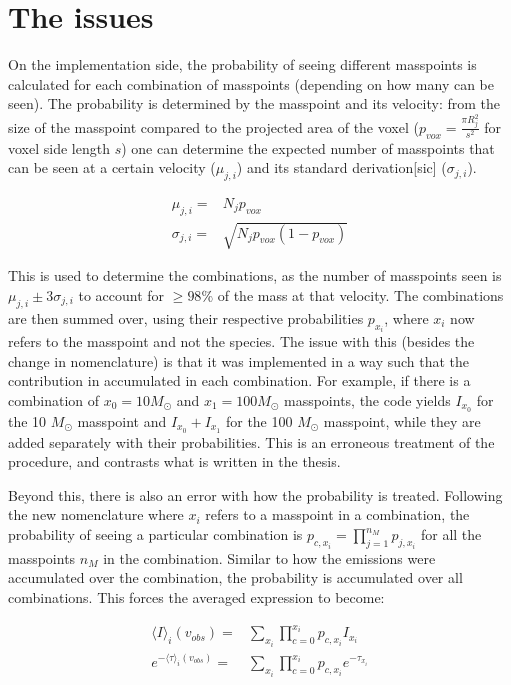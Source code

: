 \documentclass[amsmath,align]{paper}
\begin{document}
  \section{The issues}
  On the implementation side, the probability of seeing different masspoints is calculated for each combination of masspoints (depending on how many can be seen). The probability is determined by the masspoint and its velocity: from the size of the masspoint compared to the projected area of the voxel ($p_{vox}=\frac{\pi R_j^2}{s^2}$ for voxel side length $s$) one can determine the expected number of masspoints that can be seen at a certain velocity ($\mu_{j,i}$) and its standard derivation[sic] ($\sigma_{j,i}$).
  
  \begin{align}
    \mu_{j,i} =& N_j p_{vox} \\
    \sigma_{j,i} =& \sqrt{N_j p_{vox} (1-p_{vox})}
  \end{align}
  
  This is used to determine the combinations, as the number of masspoints seen is $\mu_{j,i} \pm 3\sigma_{j,i}$ to account for $\geq 98 \%$ of the mass at that velocity. The combinations are then summed over, using their respective probabilities $p_{x_i}$, where $x_i$ now refers to the masspoint and not the species. The issue with this (besides the change in nomenclature) is that it was implemented in a way such that the contribution in accumulated in each combination. For example, if there is a combination of $x_0 = 10 M_\odot$ and $x_1 = 100 M_\odot$ masspoints, the code yields $I_{x_0}$ for the 10 $M_\odot$ masspoint and $I_{x_0}+I_{x_1}$ for the 100 $M_\odot$ masspoint, while they are added separately with their probabilities. This is an erroneous treatment of the procedure, and contrasts what is written in the thesis.
  
  Beyond this, there is also an error with how the probability is treated. Following the new nomenclature where $x_i$ refers to a masspoint in a combination, the probability of seeing a particular combination is $p_{c,x_i} = \prod_{j=1}^{n_M} p_{j,x_i}$ for all the masspoints $n_M$ in the combination. Similar to how the emissions were accumulated over the combination, the probability is accumulated over all combinations. This forces the averaged expression to become:
  
  \begin{align}
    \langle I \rangle_i(v_{obs}) =& \sum_{x_i} \prod_{c=0}^{x_i} p_{c,x_i} I_{x_i} \\
    e^{-\langle \tau \rangle_i(v_{obs})} =& \sum_{x_i} \prod_{c=0}^{x_i} p_{c,x_i} e^{-\tau_{x_i}}
  \end{align}
  
\end{document}
